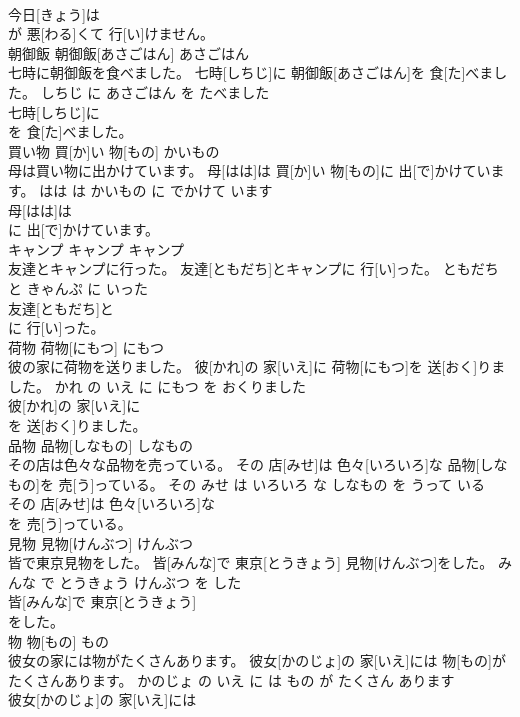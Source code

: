 \documentclass[8pt]{extreport}
\begin{document}
\begin{CJK}{UTF8}{min}
\\	今日[きょう]は
\\	が 悪[わる]くて 行[い]けません。			
\\	朝御飯	朝御飯[あさごはん]	あさごはん	
\\	七時に朝御飯を食べました。	七時[しちじ]に 朝御飯[あさごはん]を 食[た]べました。	しちじ に あさごはん を たべました	
\\	七時[しちじ]に
\\	を 食[た]べました。			
\\	買い物	買[か]い 物[もの]	かいもの	
\\	母は買い物に出かけています。	母[はは]は 買[か]い 物[もの]に 出[で]かけています。	はは は かいもの に でかけて います	
\\	母[はは]は
\\	に 出[で]かけています。			
\\	キャンプ	キャンプ	キャンプ	
\\	友達とキャンプに行った。	友達[ともだち]とキャンプに 行[い]った。	ともだち と きゃんぷ に いった	
\\	友達[ともだち]と
\\	に 行[い]った。			
\\	荷物	荷物[にもつ]	にもつ	
\\	彼の家に荷物を送りました。	彼[かれ]の 家[いえ]に 荷物[にもつ]を 送[おく]りました。	かれ の いえ に にもつ を おくりました	
\\	彼[かれ]の 家[いえ]に
\\	を 送[おく]りました。			
\\	品物	品物[しなもの]	しなもの	
\\	その店は色々な品物を売っている。	その 店[みせ]は 色々[いろいろ]な 品物[しなもの]を 売[う]っている。	その みせ は いろいろ な しなもの を うって いる	
\\	その 店[みせ]は 色々[いろいろ]な
\\	を 売[う]っている。			
\\	見物	見物[けんぶつ]	けんぶつ	
\\	皆で東京見物をした。	皆[みんな]で 東京[とうきょう] 見物[けんぶつ]をした。	みんな で とうきょう けんぶつ を した	
\\	皆[みんな]で 東京[とうきょう]
\\	をした。			
\\	物	物[もの]	もの	
\\	彼女の家には物がたくさんあります。	彼女[かのじょ]の 家[いえ]には 物[もの]がたくさんあります。	かのじょ の いえ に は もの が たくさん あります	
\\	彼女[かのじょ]の 家[いえ]には

\end{CJK}
\end{document}
